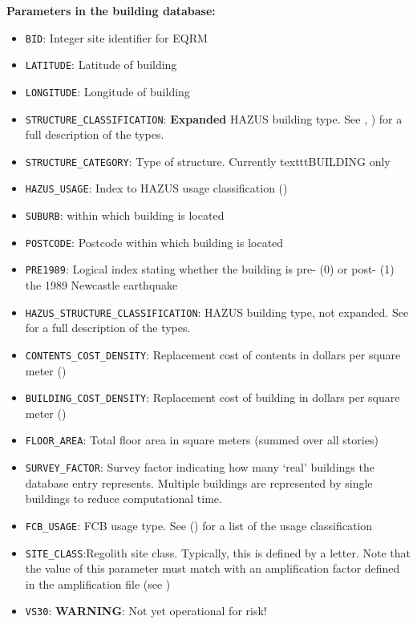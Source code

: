 \textbf{Parameters in the building database:}
\begin{itemize}
\item \texttt{BID}: Integer site identifier for EQRM
\item \texttt{LATITUDE}: Latitude of building
\item \texttt{LONGITUDE}: Longitude of building

\item \texttt{STRUCTURE\_CLASSIFICATION}: \textbf{Expanded} HAZUS
  building type. See 
    , ) for a full
    description of the types.

\item \texttt{STRUCTURE\_CATEGORY}: Type of structure. Currently texttt{BUILDING} only
\item \texttt{HAZUS\_USAGE}: Index to HAZUS usage classification ()
\item \texttt{SUBURB}: within which building is located
\item \texttt{POSTCODE}: Postcode within which building is located
\item \texttt{PRE1989}: Logical index stating whether the building is pre- (0) or post- (1) the 1989 Newcastle earthquake
\item \texttt{HAZUS\_STRUCTURE\_CLASSIFICATION}: HAZUS building
  type, not expanded. See  for a full
  description of the types.
\item \texttt{CONTENTS\_COST\_DENSITY}: Replacement cost of contents in dollars per square meter ()
\item \texttt{BUILDING\_COST\_DENSITY}: Replacement cost of building in dollars per square meter ()
\item \texttt{FLOOR\_AREA}: Total floor area in square meters (summed over all stories)
\item \texttt{SURVEY\_FACTOR}: Survey factor indicating how many
  `real' buildings the database entry represents.  Multiple buildings
  are represented by single buildings to reduce computational time.
\item \texttt{FCB\_USAGE}: FCB usage type. See
  ()  for a list of the usage
  classification
\item \texttt{SITE\_CLASS}:Regolith site class. Typically, this is defined
by a letter. Note that the value of this parameter must match with
an amplification factor defined in the amplification file (see
)
\item \texttt{VS30}: \textbf{WARNING}: Not yet operational for risk!
\end{itemize}



